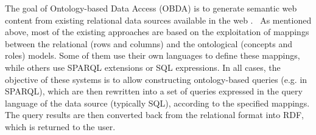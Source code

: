 The goal of Ontology-based Data Access (OBDA) is to \linebreak generate semantic web content from existing relational data sources available in the web \cite{Sahoo_09}.\
%
As mentioned above, most of the existing approaches are based on the exploitation of mappings between the relational
(rows and columns) and the ontological (concepts and roles) models. Some of them use their own languages to define
these mappings, while others use SPARQL extensions or SQL expressions.
In all cases, the objective of these systems is to allow constructing ontology-based queries (e.g. in SPARQL), which
are then rewritten into a set of queries expressed in the query language of the data source (typically SQL), according
to the specified mappings. The query results are then converted back from the relational format into RDF, which is
returned to the user.

